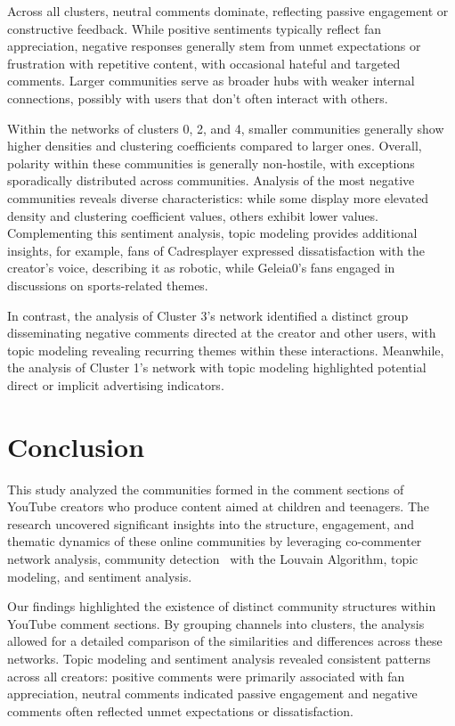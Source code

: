 \documentclass[sigconf]{acmart}
\begin{document}
Across all clusters, neutral comments dominate, reflecting passive engagement or constructive feedback.
While positive sentiments typically reflect fan appreciation, 
negative responses generally stem from unmet expectations or frustration with repetitive content, with 
occasional hateful and targeted comments. 
Larger communities serve as broader hubs with weaker internal connections,
possibly with users that don't often interact with others.

Within the networks of clusters 0, 2, and 4, smaller communities generally show higher densities and 
clustering coefficients compared to larger ones. Overall, polarity within these communities is generally 
non-hostile, with exceptions sporadically distributed across communities. 
Analysis of the most negative communities reveals diverse characteristics: 
while some display more elevated density and clustering coefficient values, 
others exhibit lower values. Complementing this sentiment analysis, topic modeling provides additional insights,
for example, fans of Cadresplayer expressed dissatisfaction with the creator's voice, 
describing it as robotic, while Geleia0's fans engaged in discussions on sports-related themes.

In contrast, the analysis of Cluster 3's network identified a distinct group disseminating negative 
comments directed at the creator and other users, with topic modeling revealing recurring themes within 
these interactions. Meanwhile, the analysis of Cluster 1's network with topic modeling highlighted 
potential direct or implicit advertising indicators.

\section{Conclusion}

This study analyzed the communities formed in the comment sections of YouTube creators who produce 
content aimed at children and teenagers. The research uncovered significant insights into the structure, engagement, and thematic dynamics of these online communities by leveraging co-commenter network analysis, community detection 
with the Louvain Algorithm, topic modeling, and sentiment analysis.

Our findings highlighted the existence of distinct community structures within YouTube comment sections. 
By grouping channels into clusters, the analysis allowed for a detailed comparison of the similarities 
and differences across these networks. Topic modeling and sentiment analysis revealed consistent 
patterns across all creators: positive comments were primarily associated with fan appreciation, 
neutral comments indicated passive engagement and negative comments often reflected unmet expectations 
or dissatisfaction. 
\end{document}

